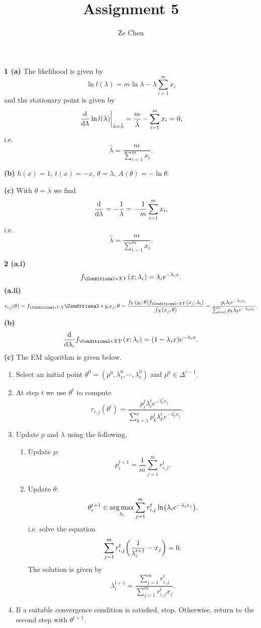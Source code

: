 \documentclass{article}
\title{Assignment 5}
\author{Ze Chen}
\makeatletter
\newcommand*{\shifttext}[1]{%
  \settowidth{\@tempdima}{#1}%
  \hspace{-\@tempdima}#1%
}
\newcommand{\plabel}[1]{%
\shifttext{\textbf{#1}\quad}%
}
\newcommand{\prule}{%
\begin{center}%
\hdashrule[0.5ex]{.99\linewidth}{1pt}{1pt 2.5pt}%
\end{center}%
}
\newcommand{\minusbaseline}{\abovedisplayskip=0pt\abovedisplayshortskip=0pt~\vspace*{-\baselineskip}}%
\makeatother
\begin{document}
\maketitle

\plabel{1 (a)}%
The likelihood is given by
\[ \ln l(\lambda) = m \ln \lambda - \lambda \sum_{i=1}^m x_i \]
and the stationary point is given by
\[ \eval{\dv{}{\lambda} \ln l(\lambda)}_{\lambda=\hat{\lambda}} = \frac{m}{\hat{\lambda}} - \sum_{i=1}^m x_i = 0, \]
i.e.
\[ \hat{\lambda} = \frac{m}{\sum_{i=1}^m x_i}. \]

\plabel{(b)}%
$h(x) = 1$, $t(x) = -x$, $\theta = \lambda$, $A(\theta) = -\ln \theta$.

\plabel{(c)}%
With $\theta = \lambda$ we find
\[ \dv{}{\lambda} (-\ln \theta) = -\frac{1}{\lambda} = -\frac{1}{m} \sum_{i=1}^m x_i, \]
i.e.
\[ \hat{\lambda} = \frac{m}{\sum_{i=1}^m x_i}. \]

\prule

\plabel{2 (a.i)}%
\begingroup\minusbaseline
\[ f_{\Conditional*{X}{Y}}(x;\lambda_i) = \lambda_i e^{-\lambda_i x}.  \]
\endgroup
\plabel{(a.ii)}%
\begingroup\minusbaseline
\[ r_{i,j}(\theta) = f_{\Conditional*{Y}{X}}\Conditional*{y_i}{x_j;\theta} = \frac{f_Y(y_i;\theta) f_{\Conditional*{X}{Y}}(x_j;\lambda_i)}{f_X(x_j;\theta)} = \frac{p_i \lambda_i e^{-\lambda_i x_j}}{\sum_{k=1}^c p_k \lambda_k e^{-\lambda_k x_j}}. \]
\endgroup
\plabel{(b)}%
\begingroup\minusbaseline
\[ \dv{}{\lambda_i} f_{\Conditional*{X}{Y}}(x;\lambda_i) = (1 - \lambda_i x) e^{-\lambda_i x}. \]
\endgroup
\plabel{(c)}%
The EM algorithm is given below.
\begin{enumerate}
    \item Select an initial point $\theta^0 = (p^0, \lambda^0_1,\cdots,\lambda^0_c)$ and $p^0 \in \Delta^{c-1}$.
    \item At step $t$ we use $\theta^t$ to compute
    \[ r_{i,j}(\theta^t) = \frac{p^t_i \lambda^t_i e^{-\lambda^t_i x_j}}{\sum_{k=1}^c p^t_k \lambda^t_k e^{-\lambda^t_k x_j}}. \]
    \item Update $p$ and $\lambda$ using the following.
    \begin{enumerate}
        \item Update $p$:
        \[ p^{t+1}_i = \frac{1}{m} \sum_{j=1}^m r^t_{i,j}. \]
        \item Update $\theta$:
        \[ \theta_i^{t+1} \in \operatorname*{arg\,max}_{\lambda_i} \sum_{j=1}^m r^t_{i,j} \ln(\lambda_i e^{-\lambda_i x_j}), \]
        i.e. solve the equation
        \[ \sum_{j=1}^m r^t_{i,j} \qty(\frac{1}{\lambda^{t+1}_i} - x_j) = 0. \]
        The solution is given by
        \[ \lambda^{t+1}_i = \frac{\sum_{j=1}^m r^t_{i,j}}{\sum_{j=1}^m r^t_{i,j} x_j}. \]
    \end{enumerate}
    \item If a suitable convergence condition is satisfied, stop.
    Otherwise, return to the second step with $\theta^{t+1}$.
\end{enumerate}
\end{document}
